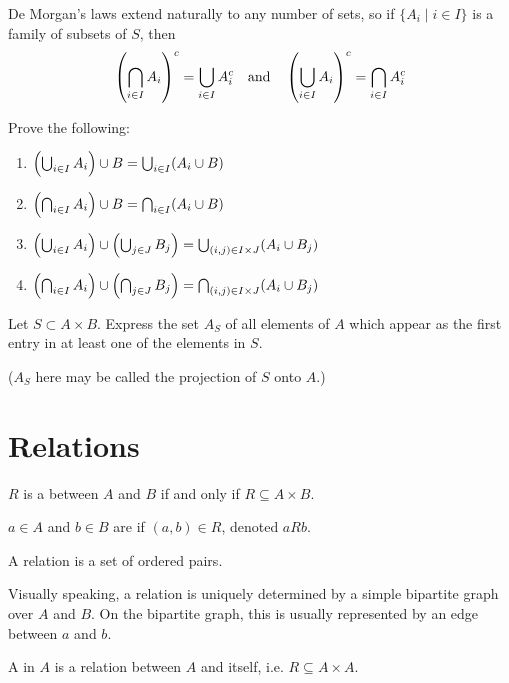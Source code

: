 De Morgan’s laws extend naturally to any number of sets, so if $\{A_i \mid i \in I\}$ is a family of subsets of $S$, then
\[ \left(\bigcap_{i\in I}A_i\right)^c = \bigcup_{i\in I}A_i^c \quad \text{and} \quad \left(\bigcup_{i\in I}A_i\right)^c = \bigcap_{i\in I}A_i^c \]

\begin{exercise}
Prove the following:
\begin{enumerate}
\item $\left(\bigcup_{i\in I}A_i\right)\cup B=\bigcup_{i\in I}(A_i\cup B)$
\item $\left(\bigcap_{i\in I}A_i\right)\cup B=\bigcap_{i\in I}(A_i\cup B)$
\item $\left(\bigcup_{i\in I}A_i\right)\cup\left(\bigcup_{j\in J}B_j\right)=\bigcup_{(i,j)\in I\times J}(A_i\cup B_j)$
\item $\left(\bigcap_{i\in I}A_i\right)\cup\left(\bigcap_{j\in J}B_j\right)=\bigcap_{(i,j)\in I\times J}(A_i\cup B_j)$
\end{enumerate}
\end{exercise}

\begin{exercise}
Let $S\subset A\times B$. Express the set $A_S$ of all elements of $A$ which appear as the first entry in at least one of the elements in $S$.

($A_S$ here may be called the projection of $S$ onto $A$.)
\end{exercise}
\pagebreak

\section{Relations}
\begin{definition}[Relation]
$R$ is a  between $A$ and $B$ if and only if $R\subseteq A\times B$.

$a \in A$ and $b \in B$ are  if $(a,b) \in R$, denoted $a R b$.
\end{definition}

\begin{remark}
A relation is a set of ordered pairs.
\end{remark}

Visually speaking, a relation is uniquely determined by a simple bipartite graph over $A$ and $B$. On the bipartite graph, this is usually represented by an edge between $a$ and $b$.

\begin{definition}
A  in $A$ is a relation between $A$ and itself, i.e. $R \subseteq A \times A$.
\end{definition}

